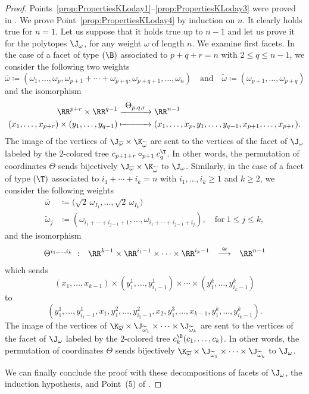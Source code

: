 \documentclass[JEP,XML,SOM,NoFloatCountersInSection,Unicode,published]{cedram}
\def\To#1{\mathchoice{\xrightarrow{\textstyle\kern4pt#1\kern3pt}}{\stackrel{#1}{\longrightarrow}}{}{}}
\def\Mto#1{\mathrel{\mapstochar\To{#1}}}
\theoremstyle{definition}
\theoremstyle{plain}
\begin{document}
\begin{proof}
Points~\eqref{prop:PropertiesKLoday1}--\eqref{prop:PropertiesKLoday3} were proved in \cite{Forcey08}.
We prove Point~\eqref{prop:PropertiesKLoday4} by induction on $n$.
It clearly holds true for $n=1$. Let us suppose that it holds true up to $n-1$ and let us prove it for the polytopes $\J_\omega$, for any weight $\omega$ of length $n$.
We examine first facets.
In the case of a facet of type $(\B)$ associated to $p+q+r=n$ with $2\leq q \leq n-1$, we consider the following two weights
\[
\overline{\omega}\coloneqq (\omega_1, \ldots, \omega_{p}, \omega_{p+1}+\cdots+\omega_{p+q}, \omega_{p+q+1}, \ldots, \omega_{n})
\quad \text{and} \quad
\widetilde{\omega}\coloneqq (\omega_{p+1}, \ldots, \omega_{p+q})
\]
and the isomorphism
\begin{align*}
\RR^{p+r} \times \RR^{q-1} &\To{\Theta_{p,q,r}} \RR^{n-1} \\
(x_1, \ldots, x_{p+r}) \times (y_1, \ldots, y_{q-1}) &\Mto{\hphantom{\Theta_{p,q,r}}}
(x_1, \ldots, x_{p}, y_1, \ldots, y_{q-1}, x_{p+1}, \ldots, x_{p+r}).
\end{align*}
The image of the vertices of $\J_{\overline{\omega}}\times \K_{\widetilde{\omega}}$ are sent to the vertices of the facet of $\J_\omega$
labeled by the $2$-colored tree $c_{p+1+r}\circ_{p+1} c^\T_q$.
In other words, the permutation of coordinates $\Theta$ sends bijectively $\J_{\overline{\omega}}\times \K_{\widetilde{\omega}}$ to $\J_\omega$.
Similarly, in the case of a facet of type $(\T)$ associated to $i_1+\cdots+i_k=n$ with
$i_1, \ldots,i_k\geq 1$ and $k\geq 2$,
we consider the following weights
\begin{align*}
\overline{\omega}&\coloneqq \big(\sqrt{2}\,\omega_{I_1}, \ldots, \sqrt{2}\,\omega_{I_k}\big)\\
\tag*{and}
\widetilde{\omega}_j&\coloneqq (\omega_{i_1+\cdots+i_{j-1}+1}, \ldots, \omega_{i_1+\cdots+i_{j-1}+i_j}), \quad \text{for}\ 1\leq j\leq k,
\end{align*}
and the isomorphism
\begin{align*}
\begin{array}{rccc}
\Theta^{i_1, \ldots, i_k}\ : & \RR^{k-1}\times \RR^{i_1-1}\times \cdots \times \RR^{i_k-1} &\To{\cong} &\RR^{n-1}
\end{array}
\end{align*}
which sends
\[
(x_1, \ldots, x_{k-1})\times (y_1^1, \ldots, y^1_{i_1-1})\times \cdots
\times (y_1^k, \ldots, y^k_{i_k-1})\]
to
\[
(
y^1_1,\ldots, y^1_{i_1-1}, x_1, y^2_1, \ldots, y^2_{i_2-1}, x_2, y^3_1, \ldots, x_{k-1}, y^k_1, \ldots, y^k_{i_k-1}
).\]
The image of the vertices of
$\K_{\overline{\omega}}\times \J_{\widetilde{\omega}_1}\times \cdots \times \J_{\widetilde{\omega}_k}$ are sent to the vertices of the facet of $\J_\omega$
labeled by the $2$-colored tree $c^\B_k(c_1, \ldots, c_k)$. In other words, the permutation of coordinates $\Theta$ sends bijectively $\K_{\overline{\omega}}\times \J_{\widetilde{\omega}_1}\times \cdots \times \J_{\widetilde{\omega}_k}$ to $\J_\omega$.

We can finally conclude the proof with these decompositions of facets of $\J_\omega$, the induction hypothesis, and Point~(5) of \cite[Prop.\,1]{MTTV19}.
\end{proof}
\end{document}
